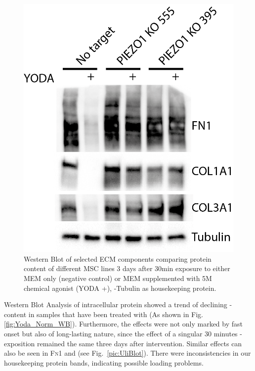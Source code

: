 \begin{figure}
	\centering
	\includegraphics[width=0.7\linewidth]{Uli_Blot_KO.png}
	\caption{Western Blot of selected ECM components comparing protein content of different MSC lines 3 days after 30min exposure to either MEM\textalpha{} only (negative control) or MEM\textalpha{} supplemented with 5\textmu{}M chemical \Piezo{} agonist (YODA +), \textalpha{}-Tubulin as housekeeping protein.}
	\label{pic:UliBlot}
\end{figure}

Western Blot Analysis of intracellular protein showed a trend of declining \colone-content in samples that have been treated with \Yoda{} (As shown in Fig. \ref{fig:Yoda_Norm_WB}). Furthermore, the effects were not only marked by fast onset but also of long-lasting nature, since the effect of a singular 30 minutes \Yoda{}-exposition remained the same three days after intervention. Similar effects can also be seen in \textsc{Fn1} and \colthree{} (see Fig.~\vref{pic:UliBlot}). There were inconsistencies in our housekeeping protein bands, indicating possible loading problems. \par

